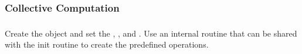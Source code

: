 \documentclass{article}
\begin{document}







\subsubsection{Collective Computation}

\subsubsection{}
Create the object and set the ,
, and .  Use an 
internal routine that can be shared with the init routine to create
the predefined operations.
\end{document}
